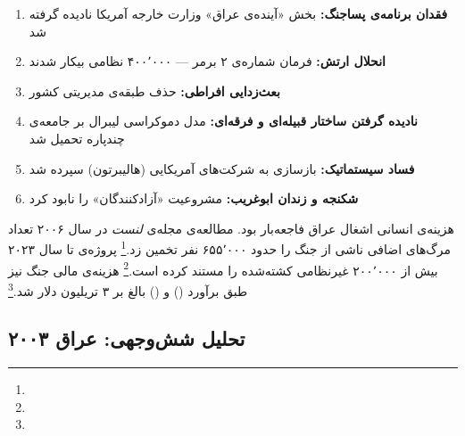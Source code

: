 \begin{tcolorbox}[failbox, title={عوامل شکست: دولت‌سازی در عراق}]
\begin{enumerate}
\item \textbf{فقدان برنامه‌ی پساجنگ:} بخش «آینده‌ی عراق» وزارت خارجه آمریکا نادیده گرفته شد
\item \textbf{انحلال ارتش:} فرمان شماره‌ی ۲ برمر — ۴۰۰٬۰۰۰ نظامی بیکار شدند
\item \textbf{بعث‌زدایی افراطی:} حذف طبقه‌ی مدیریتی کشور
\item \textbf{نادیده گرفتن ساختار قبیله‌ای و فرقه‌ای:} مدل دموکراسی لیبرال بر جامعه‌ی چندپاره تحمیل شد
\item \textbf{فساد سیستماتیک:} بازسازی به شرکت‌های آمریکایی (هالیبرتون) سپرده شد
\item \textbf{شکنجه و زندان ابوغریب:} مشروعیت «آزادکنندگان» را نابود کرد
\end{enumerate}
\end{tcolorbox}

هزینه‌ی انسانی اشغال عراق فاجعه‌بار بود. مطالعه‌ی مجله‌ی \textit{لنست} در سال ۲۰۰۶ تعداد مرگ‌های اضافی ناشی از جنگ را حدود ۶۵۵٬۰۰۰ نفر تخمین زد.\footnote{} پروژه‌ی  تا سال ۲۰۲۳ بیش از ۲۰۰٬۰۰۰ غیرنظامی کشته‌شده را مستند کرده است.\footnote{} هزینه‌ی مالی جنگ نیز طبق برآورد  () و  () بالغ بر ۳ تریلیون دلار شد.\footnote{}

\subsection{تحلیل شش‌وجهی: عراق ۲۰۰۳}
\label{subsec:ch10-iraq-hexagonal}

